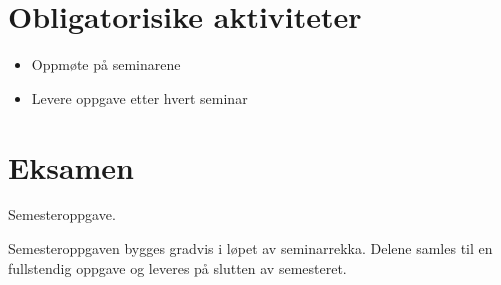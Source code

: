 \documentclass[12pt,a4paper,norsk]{article}
\begin{document}
\section*{Obligatorisike aktiviteter}

\begin{itemize}
  \item Oppmøte på seminarene
  \item Levere oppgave etter hvert seminar
\end{itemize}


\section*{Eksamen}

Semesteroppgave.

Semesteroppgaven bygges gradvis i løpet av seminarrekka. Delene samles til en fullstendig oppgave og leveres på slutten av semesteret.
\end{document}
